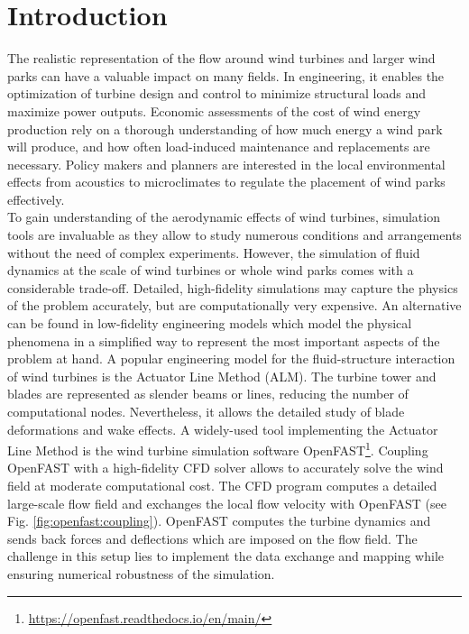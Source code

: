 \section{Introduction}

The realistic representation of the flow around wind turbines and larger wind parks can have a valuable impact on many fields. In engineering, it enables the optimization of turbine design and control to minimize structural loads and maximize power outputs. Economic assessments of the cost of wind energy production rely on a thorough understanding of how much energy a wind park will produce, and how often load-induced maintenance and replacements are necessary. Policy makers and planners are interested in the local environmental effects from acoustics to microclimates to regulate the placement of wind parks effectively.\\

To gain understanding of the aerodynamic effects of wind turbines, simulation tools are invaluable as they allow to study numerous conditions and arrangements without the need of complex experiments. However, the simulation of fluid dynamics at the scale of wind turbines or whole wind parks comes with a considerable trade-off. Detailed, high-fidelity simulations may capture the physics of the problem accurately, but are computationally very expensive. An alternative can be found in low-fidelity engineering models which model the physical phenomena in a simplified way to represent the most important aspects of the problem at hand. A popular engineering model for the fluid-structure interaction of wind turbines is the Actuator Line Method (ALM). The turbine tower and blades are represented as slender beams or lines, reducing the number of computational nodes. Nevertheless, it allows the detailed study of blade deformations and wake effects. 
A widely-used tool implementing the Actuator Line Method is the wind turbine simulation software OpenFAST\footnote{\url{https://openfast.readthedocs.io/en/main/}}. Coupling OpenFAST with a high-fidelity CFD solver allows to accurately solve the wind field at moderate computational cost. 
The CFD program computes a detailed large-scale flow field and exchanges the local flow velocity with OpenFAST (see Fig. \ref{fig:openfast:coupling}). OpenFAST computes the turbine dynamics and sends back forces and deflections which are imposed on the flow field. The challenge in this setup lies to implement the data exchange and mapping while ensuring numerical robustness of the simulation.\\

